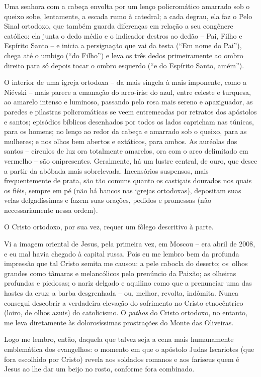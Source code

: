 Uma senhora com a cabeça envolta por um lenço policromático amarrado sob
o queixo sobe, lentamente, a escada rumo à catedral; a cada degrau, ela
faz o Pelo Sinal ortodoxo, que também guarda diferenças em relação a seu
congênere católico: ela junta o dedo médio e o indicador destros ao
dedão -- Pai, Filho e Espírito Santo -- e inicia a persignação que vai
da testa (``Em nome do Pai''), chega até o umbigo (``do Filho'') e leva
os três dedos primeiramente ao ombro direito para só depois tocar o
ombro esquerdo (``e do Espírito Santo, amém'').

O interior de uma igreja ortodoxa -- da mais singela à mais imponente,
como a Niévski -- mais parece a emanação do arco-íris: do azul, entre
celeste e turquesa, ao amarelo intenso e luminoso, passando pelo rosa
mais sereno e apaziguador, as paredes e pilastras policromáticas se veem
entremeadas por retratos dos apóstolos e santos; episódios bíblicos
desenhados por todos os lados capricham nas túnicas, para os homens; no
lenço ao redor da cabeça e amarrado sob o queixo, para as mulheres; e
nos olhos bem abertos e extáticos, para ambos. As auréolas dos santos --
círculos de luz ora totalmente amarelos, ora com o arco delimitado em
vermelho -- são onipresentes. Geralmente, há um lustre central, de ouro,
que desce a partir da abóbada mais sobrelevada. Incensórios suspensos,
mais frequentemente de prata, são tão comuns quanto os castiçais
dourados nos quais os fiéis, sempre em pé (não há bancos nas igrejas
ortodoxas), depositam suas velas delgadíssimas e fazem suas orações,
pedidos e promessas (não necessariamente nessa ordem).

O Cristo ortodoxo, por sua vez, requer um fôlego descritivo à parte.

Vi a imagem oriental de Jesus, pela primeira vez, em Moscou -- era abril
de 2008, e eu mal havia chegado à capital russa. Pois eu me lembro bem
da profunda impressão que tal Cristo semita me causou: a pele cabocla do
deserto; os~olhos grandes como tâmaras e melancólicos pelo prenúncio da
Paixão; as olheiras profundas e piedosas; o nariz delgado e aquilino
como que a prenunciar uma das hastes da cruz; a barba desgrenhada -- ou,
melhor, revolta, indômita. Nunca consegui descobrir a verdadeira
elevação do sofrimento no Cristo etnocêntrico (loiro, de olhos azuis) do
catolicismo. O \emph{pathos} do Cristo ortodoxo, no entanto, me leva
diretamente às dolorosíssimas prostrações do Monte das Oliveiras.

Logo me lembro, então, daquela que talvez seja a cena mais humanamente
emblemática dos evangelhos: o momento em que o apóstolo Judas Iscariotes
(que fora escolhido por Cristo) revela aos soldados romanos e aos
fariseus quem é Jesus ao lhe dar um beijo no rosto, conforme fora
combinado.

